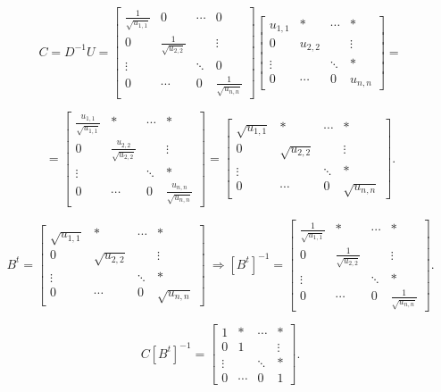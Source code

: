 \[C = D^{-1}U = \left[
\begin{array}{cccc}
\frac{1}{\sqrt{u_{1,1}}} & 0 & \cdots & 0 \\
0 & \frac{1}{\sqrt{u_{2,2}}} & & \vdots \\
\vdots & & \ddots & 0 \\
0 &\cdots & 0 & \frac{1}{\sqrt{u_{n,n}}}
\end{array}
\right]\left[
\begin{array}{cccc}
u_{1,1} & * & \cdots & * \\
0 & u_{2,2} & & \vdots \\
\vdots & & \ddots & * \\
0 &\cdots & 0 & u_{n,n}
\end{array}
\right] =
\]

\[ =
\left[
\begin{array}{cccc}
\frac{u_{1,1}}{\sqrt{u_{1,1}}} & * & \cdots & * \\
0 & \frac{u_{2,2}}{\sqrt{u_{2,2}}} & & \vdots \\
\vdots & & \ddots & * \\
0 &\cdots & 0 & \frac{u_{n,n}}{\sqrt{u_{n,n}}}
\end{array}
\right] =
\left[
\begin{array}{cccc}
\sqrt{u_{1,1}} & * & \cdots & * \\
0 & \sqrt{u_{2,2}} & & \vdots \\
\vdots & & \ddots & * \\
0 &\cdots & 0 & \sqrt{u_{n,n}}
\end{array}
\right].
\]

\[
B^t = \left[
\begin{array}{cccc}
\sqrt{u_{1,1}} & * & \cdots & * \\
0 & \sqrt{u_{2,2}} & & \vdots \\
\vdots & & \ddots & * \\
0 &\cdots & 0 & \sqrt{u_{n,n}}
\end{array}
\right] \ \Rightarrow
\left[B^t\right]^{-1} =
\left[
\begin{array}{cccc}
\frac{1}{\sqrt{u_{1,1}}} & * & \cdots & * \\
0 & \frac{1}{\sqrt{u_{2,2}}} & & \vdots \\
\vdots & & \ddots & * \\
0 &\cdots & 0 & \frac{1}{\sqrt{u_{n,n}}}
\end{array}
\right].
\]

\[
C\left[B^t\right]^{-1} =
\left[
\begin{array}{cccc}
1 & * & \cdots & * \\
0 & 1 & & \vdots \\
\vdots & & \ddots & * \\
0 &\cdots & 0 & 1
\end{array}
\right].
\]

